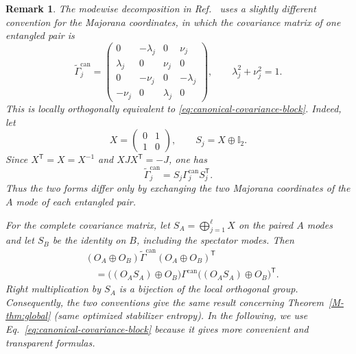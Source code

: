 \documentclass[aps,prl,twocolumn,superscriptaddress,reprint,longbibliography,nofootinbib]{revtex4-2}
\newtheorem{remark}{Remark}
\begin{document}
\begin{remark}
The modewise decomposition in Ref.~\cite{BoteroReznik2004} uses a slightly different convention for the Majorana
coordinates, in which the covariance matrix of one entangled pair is
\begin{equation}
 \widetilde{\Gamma}^{\mathrm{can}}_j
 =
 \begin{pmatrix}
  0&-\lambda_j&0&\nu_j\\
  \lambda_j&0&\nu_j&0\\
  0&-\nu_j&0&-\lambda_j\\
  -\nu_j&0&\lambda_j&0
 \end{pmatrix},
 \qquad
 \lambda_j^2+\nu_j^2=1.
 \label{eq:botero-canonical-covariance-block}
\end{equation}
This is locally \textit{orthogonally equivalent} to
\eqref{eq:canonical-covariance-block}. Indeed, let
\begin{equation}
 X=\begin{pmatrix}0&1\\1&0\end{pmatrix},
 \qquad
 S_j=X\oplus \mathbb{I}_2.
\end{equation}
Since \(X^{\mathsf T}=X=X^{-1}\) and \(XJX^{\mathsf T}=-J\), one has
\begin{equation}
 \widetilde{\Gamma}^{\mathrm{can}}_j
 =S_j\Gamma^{\mathrm{can}}_jS_j^{\mathsf T}.
 \label{eq:botero-our-convention}
\end{equation}
Thus the two forms differ only by exchanging the two Majorana coordinates
of the \(A\) mode of each entangled pair.

For the complete covariance matrix, let
\(S_A=\bigoplus_{j=1}^{\ell}X\) on the paired \(A\) modes and let \(S_B\)
be the identity on \(B\), including the spectator modes. Then
\begin{equation}
\begin{aligned}
 &(O_A\oplus O_B)\widetilde{\Gamma}^{\mathrm{can}}
      (O_A\oplus O_B)^{\mathsf T} \\
 &\quad =
 \bigl((O_AS_A)\oplus O_B\bigr)\Gamma^{\mathrm{can}}
 \bigl((O_AS_A)\oplus O_B\bigr)^{\mathsf T}.
\end{aligned}
\label{eq:canonical-orbit-convention-equivalence}
\end{equation}
Right multiplication by \(S_A\) is a bijection of the local orthogonal
group. Consequently, the two conventions give the same result concerning Theorem~\ref{M-thm:global} (same optimized stabilizer entropy). 
In the following, we use Eq.~\eqref{eq:canonical-covariance-block} because it gives more convenient and transparent formulas.
\end{remark}
\end{document}
